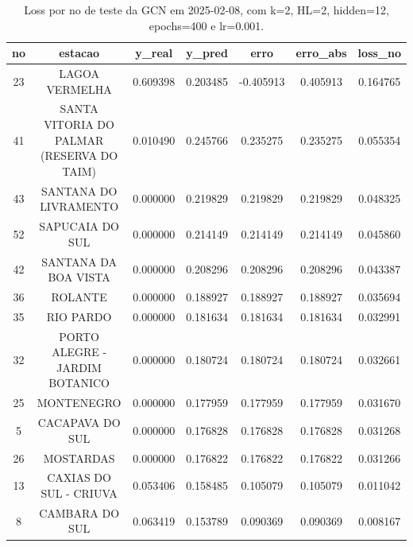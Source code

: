\begin{table}[h]
\centering
\caption{Loss por no de teste da GCN em 2025-02-08, com k=2, HL=2, hidden=12, epochs=400 e lr=0.001.}
\label{tab:gcn_loss_k2_hl2_h12_e400_d20250208}
\begin{tabular}{ccccccc}
\toprule
no & estacao & y\_real & y\_pred & erro & erro\_abs & loss\_no \\
\midrule
23 & LAGOA VERMELHA & 0.609398 & 0.203485 & -0.405913 & 0.405913 & 0.164765 \\
41 & SANTA VITORIA DO PALMAR (RESERVA DO TAIM) & 0.010490 & 0.245766 & 0.235275 & 0.235275 & 0.055354 \\
43 & SANTANA DO LIVRAMENTO & 0.000000 & 0.219829 & 0.219829 & 0.219829 & 0.048325 \\
52 & SAPUCAIA DO SUL & 0.000000 & 0.214149 & 0.214149 & 0.214149 & 0.045860 \\
42 & SANTANA DA BOA VISTA & 0.000000 & 0.208296 & 0.208296 & 0.208296 & 0.043387 \\
36 & ROLANTE & 0.000000 & 0.188927 & 0.188927 & 0.188927 & 0.035694 \\
35 & RIO PARDO & 0.000000 & 0.181634 & 0.181634 & 0.181634 & 0.032991 \\
32 & PORTO ALEGRE - JARDIM BOTANICO & 0.000000 & 0.180724 & 0.180724 & 0.180724 & 0.032661 \\
25 & MONTENEGRO & 0.000000 & 0.177959 & 0.177959 & 0.177959 & 0.031670 \\
5 & CACAPAVA DO SUL & 0.000000 & 0.176828 & 0.176828 & 0.176828 & 0.031268 \\
26 & MOSTARDAS & 0.000000 & 0.176822 & 0.176822 & 0.176822 & 0.031266 \\
13 & CAXIAS DO SUL - CRIUVA & 0.053406 & 0.158485 & 0.105079 & 0.105079 & 0.011042 \\
8 & CAMBARA DO SUL & 0.063419 & 0.153789 & 0.090369 & 0.090369 & 0.008167 \\
\bottomrule
\end{tabular}
\end{table}

